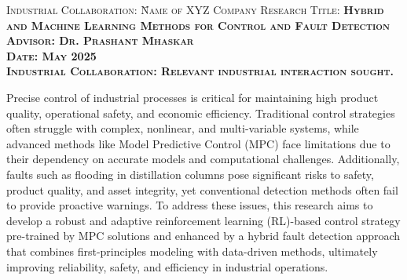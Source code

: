 



%    


\begin{tabbing}
  \scshape{Industrial Collaboration}: \= Name of XYZ Company  \kill %
  \scshape{Research Title}:           \tabs  \bfseries{Hybrid and Machine Learning Methods for Control and Fault Detection}  \\
  \scshape{Advisor}:                  \tabs  Dr. Prashant Mhaskar                                         \\
  \scshape{Date}:                     \tabs  May 2025 \\
  \scshape{Industrial Collaboration}: \tabs  Relevant industrial interaction sought. %
\end{tabbing}


\ResearchGoals

Precise control of industrial processes is critical for maintaining high product quality, operational safety, and economic efficiency. Traditional control strategies often struggle with complex, nonlinear, and multi-variable systems, while advanced methods like Model Predictive Control (MPC) face limitations due to their dependency on accurate models and computational challenges. Additionally, faults such as flooding in distillation columns pose significant risks to safety, product quality, and asset integrity, yet conventional detection methods often fail to provide proactive warnings. To address these issues, this research aims to develop a robust and adaptive reinforcement learning (RL)-based control strategy pre-trained by MPC solutions and enhanced by a hybrid fault detection approach that combines first-principles modeling with data-driven methods, ultimately improving reliability, safety, and efficiency in industrial operations.

\Background


